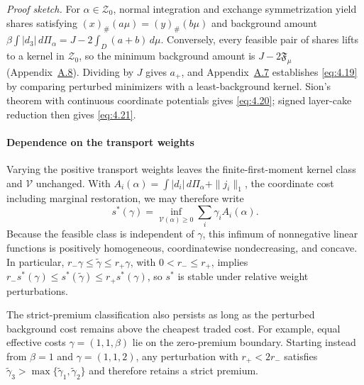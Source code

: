 \textit{Proof sketch.} For \(\alpha\in\mathcal Z_0\), normal integration and exchange symmetrization yield shares satisfying \((x)_\#(a\mu)=(y)_\#(b\mu)\) and background amount \(\beta\int|d_3|\,d\Pi_\alpha=J-2\int_D(a+b)\,d\mu\). Conversely, every feasible pair of shares lifts to a kernel in \(\mathcal Z_0\), so the minimum background amount is \(J-2\mathfrak F_\mu\) (Appendix~\hyperref[app:flow-proof]{A.8}). Dividing by \(J\) gives \(a_+\), and Appendix~\hyperref[app:boundary-sensitivity]{A.7} establishes \eqref{eq:4.19} by comparing perturbed minimizers with a least-background kernel. Sion's theorem with continuous coordinate potentials gives \eqref{eq:4.20}; signed layer-cake reduction then gives \eqref{eq:4.21}.

\paragraph{Dependence on the transport weights}\label{par:transport-weights}
Varying the positive transport weights leaves the finite-first-moment kernel class and \(\mathcal V\) unchanged. With \(A_i(\alpha)=\int|d_i|\,d\Pi_\alpha+\|j_i\|_1\), the coordinate cost including marginal restoration, we may therefore write
\begin{equation}
s^*(\gamma)=\inf_{\mathcal V(\alpha)\ge0}\sum_i\gamma_i A_i(\alpha).
\tag{4.22}\label{eq:4.22}
\end{equation}
Because the feasible class is independent of \(\gamma\), this infimum of nonnegative linear functions is positively homogeneous, coordinatewise nondecreasing, and concave. In particular, \(r_-\gamma\le\widetilde\gamma\le r_+\gamma\), with \(0<r_-\le r_+\), implies \(r_-s^*(\gamma)\le s^*(\widetilde\gamma)\le r_+s^*(\gamma)\), so \(s^*\) is stable under relative weight perturbations.

The strict-premium classification also persists as long as the perturbed background cost remains above the cheapest traded cost. For example, equal effective costs \(\gamma=(1,1,\beta)\) lie on the zero-premium boundary. Starting instead from \(\beta=1\) and \(\gamma=(1,1,2)\), any perturbation with \(r_+<2r_-\) satisfies \(\widetilde\gamma_3>\max\{\widetilde\gamma_1,\widetilde\gamma_2\}\) and therefore retains a strict premium.
